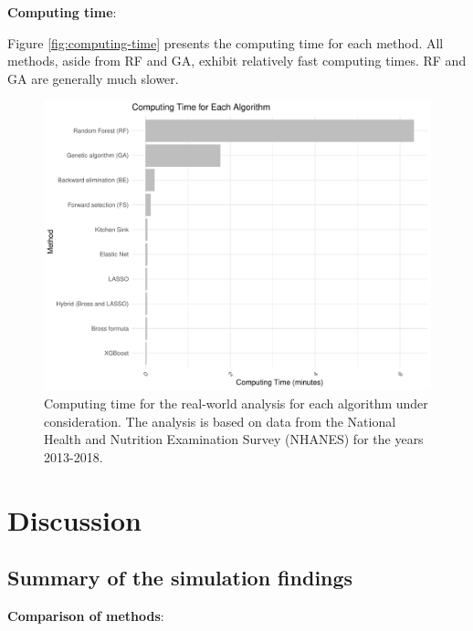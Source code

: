 \documentclass[sn-vancouver,Numbered,lineno,pdflatex]{sn-jnl}
\begin{document}
\textbf{Computing time}:

Figure \ref{fig:computing-time} presents the computing time for each
method. All methods, aside from RF and GA, exhibit relatively fast
computing times. RF and GA are generally much slower.

\begin{figure}[th]

{\centering \includegraphics[width=1\linewidth,]{figures/time} 

}

\caption{Computing time for the real-world analysis for each algorithm under consideration. The analysis is based on data from the National Health and Nutrition Examination Survey (NHANES) for the years 2013-2018.\label{fig:computing-time}}\label{fig:unnamed-chunk-4}
\end{figure}

\section{Discussion}\label{discussion}

\subsection{Summary of the simulation
findings}\label{summary-of-the-simulation-findings}

\textbf{Comparison of methods}:
\end{document}
